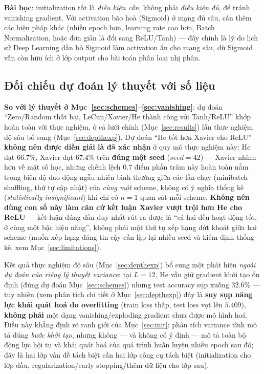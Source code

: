 \documentclass[12pt,a4paper]{report}
\newcommand{\en}[1]{\textit{#1}}
\begin{document}
\textbf{Bài học}: initialization tốt là \emph{điều kiện cần}, không phải
\emph{điều kiện đủ}, để tránh vanishing gradient. Với activation bão hoà
(Sigmoid) ở mạng đủ sâu, cần thêm các biện pháp khác (nhiều epoch hơn,
learning rate cao hơn, Batch Normalization, hoặc đơn giản là đổi sang
ReLU/Tanh) --- đây chính là lý do lịch sử Deep Learning dần bỏ Sigmoid làm
activation ẩn cho mạng sâu, dù Sigmoid vẫn còn hữu ích ở lớp output cho
bài toán phân loại nhị phân.

\subsection{Đối chiếu dự đoán lý thuyết với số liệu}

\textbf{So với lý thuyết ở Mục~\ref{sec:schemes}--\ref{sec:vanishing}}: dự
đoán ``Zero/Random thất bại, LeCun/Xavier/He thành công với Tanh/ReLU'' khớp
hoàn toàn với thực nghiệm, ở cả lưới chính (Mục~\ref{sec:results}) lẫn
thực nghiệm độ sâu bổ sung (Mục~\ref{sec:depthexp}). Dự đoán ``He tốt hơn
Xavier cho ReLU'' \textbf{không nên được diễn giải là đã xác nhận} ở quy
mô thực nghiệm này: He đạt $66.7\%$, Xavier đạt $67.4\%$ trên
\textbf{đúng một seed} ($seed{=}42$) --- Xavier nhỉnh hơn về mặt số học,
nhưng chênh lệch $0.7$ điểm phần trăm này hoàn toàn nằm trong biên độ
dao động ngẫu nhiên bình thường giữa các lần chạy (minibatch shuffling,
thứ tự cập nhật) của \emph{cùng một} scheme, không có ý nghĩa thống kê
(\en{statistically insignificant}) khi chỉ có $n{=}1$ quan sát mỗi
scheme. \textbf{Không nên dùng con số này làm căn cứ kết luận Xavier vượt
trội hơn He cho ReLU} --- kết luận đúng đắn duy nhất rút ra được là ``cả
hai đều hoạt động tốt, ở cùng một bậc hiệu năng'', không phải một thứ tự
xếp hạng dứt khoát giữa hai scheme (muốn xếp hạng đáng tin cậy cần lặp
lại nhiều seed và kiểm định thống kê, xem Mục~\ref{sec:limitations}).

Kết quả thực nghiệm độ sâu (Mục~\ref{sec:depthexp}) bổ sung một phát hiện
\emph{ngoài dự đoán của riêng lý thuyết variance}: tại $L{=}12$, He vẫn
giữ gradient khởi tạo ổn định (đúng dự đoán Mục~\ref{sec:schemes}) nhưng
test accuracy sụp xuống $32.6\%$ --- tuy nhiên (xem phân tích chi tiết
ở Mục~\ref{sec:depthexp}) đây là \textbf{suy sụp năng lực khái quát hoá
do overfitting} (train loss thấp, test loss vọt lên $5.409$), \textbf{không
phải} một dạng vanishing/exploding gradient chưa được mô hình hoá. Điều
này khẳng định rõ ranh giới của Mục~\ref{sec:init}: phân tích variance
tĩnh mô tả đúng \emph{bước khởi tạo}, nhưng không --- và không có ý định
--- mô tả toàn bộ động lực hội tụ và khái quát hoá của quá trình huấn
luyện nhiều epoch sau đó; đây là hai lớp vấn đề tách biệt cần hai lớp
công cụ tách biệt (initialization cho lớp đầu, regularization/early
stopping/thêm dữ liệu cho lớp sau).
\end{document}
